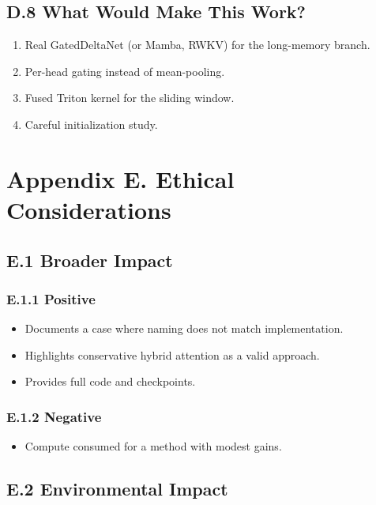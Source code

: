 \subsection{D.8 What Would Make This Work?}

\begin{enumerate}
\item Real GatedDeltaNet (or Mamba, RWKV) for the long-memory branch.
\item Per-head gating instead of mean-pooling.
\item Fused Triton kernel for the sliding window.
\item Careful initialization study.

\end{enumerate}



\section{Appendix E. Ethical Considerations}

\subsection{E.1 Broader Impact}

\subsubsection{E.1.1 Positive}

\begin{itemize}
\item Documents a case where naming does not match implementation.
\item Highlights conservative hybrid attention as a valid approach.
\item Provides full code and checkpoints.

\end{itemize}
\subsubsection{E.1.2 Negative}

\begin{itemize}
\item Compute consumed for a method with modest gains.

\end{itemize}
\subsection{E.2 Environmental Impact}


